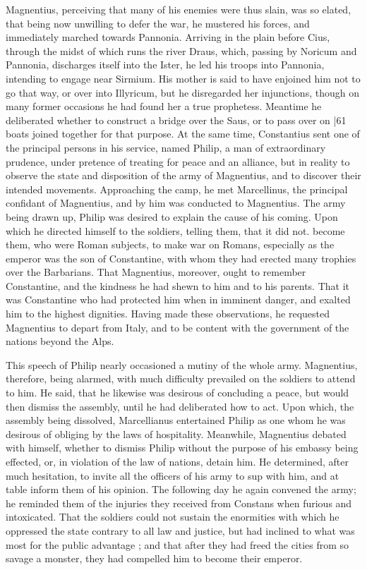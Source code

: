 Magnentius, perceiving that many of his enemies were thus slain, was so elated, that being now unwilling to defer the war, he mustered his forces, and immediately marched towards Pannonia. Arriving in the plain before Cius, through the midst of which runs the river Draus, which, passing by Noricum and Pannonia, discharges itself into the Ister, he led his troops into Pannonia, intending to engage near Sirmium. His mother is said to have enjoined him not to go that way, or over into Illyricum, but he disregarded her injunctions, though on many former occasions he had found her a true prophetess. Meantime he deliberated whether to construct a bridge over the Saus, or to pass over on
|61 boats joined together for that purpose. At the same time, Constantius sent one of the principal persons in his service, named Philip, a man of extraordinary prudence, under pretence of treating for peace and an alliance, but in reality to observe the state and disposition of the army of Magnentius, and to discover their intended movements. Approaching the camp, he met Marcellinus, the principal confidant of Magnentius, and by him was conducted to Magnentius. The army being drawn up, Philip was desired to explain the cause of his coming. Upon which he directed himself to the soldiers, telling them, that it did not. become them, who were Roman subjects, to make war on Romans, especially as the emperor was the son of Constantine, with whom they had erected many trophies over the Barbarians. That Magnentius, moreover, ought to remember Constantine, and the kindness he had shewn to him and to his parents. That it was Constantine who had protected him when in imminent danger, and exalted him to the highest dignities. Having made these observations, he requested Magnentius to depart from Italy, and to be content with the government of the nations beyond the Alps.

This speech of Philip nearly occasioned a mutiny of the whole army. Magnentius, therefore, being alarmed, with much difficulty prevailed on the soldiers to attend to him. He said, that he likewise was desirous of concluding a peace, but would then dismiss the assembly, until he had deliberated how to act. Upon which, the assembly being dissolved, Marcellianus entertained Philip as one whom he was desirous of obliging by the laws of hospitality. Meanwhile, Magnentius debated with himself, whether to dismiss Philip without the purpose of his embassy being effected, or, in violation of the law of nations, detain him. He determined, after much hesitation, to invite all the officers of his army to sup with him, and at table inform them of his opinion. The following day he again convened the army; he reminded them of the injuries they received from Constans when furious and intoxicated. That the soldiers could not sustain the enormities with which he oppressed the state contrary to all law and justice, but had inclined to what was most for the public advantage ; and that after they had freed the cities from so savage a monster, they had compelled him to become their emperor.


